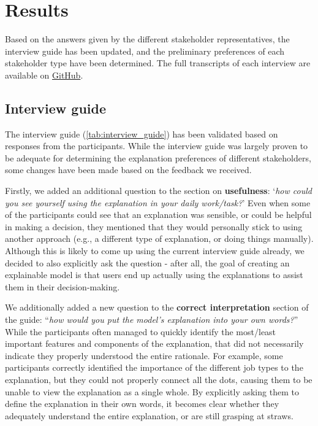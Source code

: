 \section{Results}
Based on the answers given by the different stakeholder representatives, the interview guide has been updated, and the preliminary preferences of each stakeholder type have been determined. The full transcripts of each interview are available on \href{https://github.com/Roan-Schellingerhout/JRS_explanations}{GitHub}. 

\subsection{Interview guide}

The interview guide (\cref{tab:interview_guide}) has been validated based on responses from the participants. While the interview guide was largely proven to be adequate for determining the explanation preferences of different stakeholders, some changes have been made based on the feedback we received. 

Firstly, we added an additional question to the section on \textbf{usefulness}: `\textit{how could you see yourself using the explanation in your daily work/task?}' Even when some of the participants could see that an explanation was sensible, or could be helpful in making a decision, they mentioned that they would personally stick to using another approach (e.g., a different type of explanation, or doing things manually). Although this is likely to come up using the current interview guide already, we decided to also explicitly ask the question - after all, the goal of creating an explainable model is that users end up actually using the explanations to assist them in their decision-making. 

We additionally added a new question to the \textbf{correct interpretation} section of the guide: ``\textit{how would you put the model's explanation into your own words?}'' While the participants often managed to quickly identify the most/least important features and components of the explanation, that did not necessarily indicate they properly understood the entire rationale. For example, some participants correctly identified the importance of the different job types to the explanation, but they could not properly connect all the dots, causing them to be unable to view the explanation as a single whole. By explicitly asking them to define the explanation in their own words, it becomes clear whether they adequately understand the entire explanation, or are still grasping at straws. 


